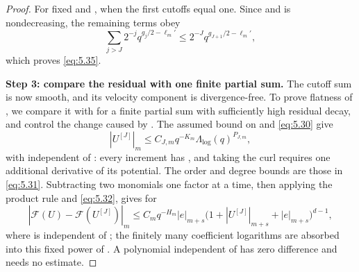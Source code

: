 \begin{proof}
For fixed  and , when
 the first  cutoffs equal one. Since
 and  is nondecreasing, the remaining terms obey
\[
 \sum_{j>J}2^{-j}q^{g_j/2-\ell_m'}
 \leq2^{-J}q^{g_{J+1}/2-\ell_m'},
\]
which proves \eqref{eq:5.35}.

%
\textbf{Step 3: compare the residual with one finite partial sum.}
The cutoff sum  is now smooth, and its velocity component is divergence-free.
To prove flatness of , we compare it with
 for a finite partial sum with sufficiently high residual
decay, and control the change caused by . The assumed bound on
 and \eqref{eq:5.30} give
\begin{equation}
 |U^{[J]}|_m\leq C_{J,m}q^{-K_m}\Lambda_{\log}(q)^{P_{J,m}},
 \tag{5.38}\label{eq:5.38}
\end{equation}
with  independent of : every increment has
, and taking the curl requires one additional derivative of its potential.
The order and degree bounds  are those in \eqref{eq:5.31}. Subtracting two
monomials one factor at a time, then applying the product rule and \eqref{eq:5.32}, gives for
\begin{equation}
 |\mathcal F(U)-\mathcal F(U^{[J]})|_m
 \leq C_mq^{-H_m}|e|_{m+s}
 \bigl(1+|U^{[J]}|_{m+s}+|e|_{m+s}\bigr)^{d-1},
 \tag{5.39}\label{eq:5.39}
\end{equation}
where  is independent of ; the finitely many
coefficient logarithms are absorbed into this fixed power of . A
polynomial independent of  has zero difference and needs no estimate.


\end{proof}
